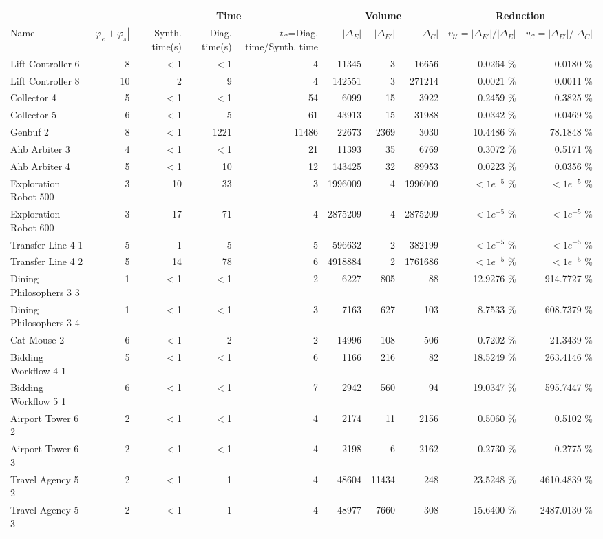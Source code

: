 \begin{tabular}{|l|r|rrr|rrr|rr|}
  \hline & & \multicolumn{3}{c|}{Time}&\multicolumn{3}{c|}{Volume} & \multicolumn{2}{c|}{Reduction}\\ \hline
Name & $|\varphi_e + \varphi_s|$ & Synth. time(s) & Diag. time(s) & $t_{\mathcal{C}}$=Diag. time/Synth. time & $|\Delta_E|$ & $|\Delta_{E'}|$ & $|\Delta_{C}|$ & $v_{\mathcal{U}}=|\Delta_{E'}|/|\Delta_{E}|$ & $v_{\mathcal{C}}=|\Delta_{E'}|/|\Delta_{C}|$ \\ 
  \hline
  Lift Controller 6 &   8 & $<$1 & $<$1 & 4 & 11345 & 3 & 16656 &  0.0264 \% &    0.0180 \% \\ 
Lift Controller 8 &  10 & 2 & 9 & 4 & 142551 & 3 & 271214 &  0.0021 \% &    0.0011 \% \\ 
  Collector 4 &   5 & $<$1 & $<$1 & 54 & 6099 & 15 & 3922 &  0.2459 \% &    0.3825 \% \\ 
Collector 5 &   6 & $<$1 & 5 & 61 & 43913 & 15 & 31988 &  0.0342 \% &    0.0469 \% \\ 
  Genbuf 2 &   8 & $<$1 & 1221 & 11486 & 22673 & 2369 & 3030 & 10.4486 \% &   78.1848 \% \\ 
Ahb Arbiter 3 &   4 & $<$1 & $<$1 & 21 & 11393 & 35 & 6769 &  0.3072 \% &    0.5171 \% \\ 
  Ahb Arbiter 4 &   5 & $<$1 & 10 & 12 & 143425 & 32 & 89953 &  0.0223 \% &    0.0356 \% \\ 
  Exploration Robot 500 &   3 & 10 & 33 & 3 & 1996009 & 4 & 1996009 & $<1e^{-5}$ \% & $<1e^{-5}$ \% \\ 
Exploration Robot 600 &   3 & 17 & 71 & 4 & 2875209 & 4 & 2875209 & $<1e^{-5}$ \% & $<1e^{-5}$ \% \\ 
  Transfer Line 4 1 &   5 & 1 & 5 & 5 & 596632 & 2 & 382199 & $<1e^{-5}$ \% & $<1e^{-5}$ \% \\ 
Transfer Line 4 2 &   5 & 14 & 78 & 6 & 4918884 & 2 & 1761686 & $<1e^{-5}$ \% & $<1e^{-5}$ \% \\ 
  Dining Philosophers 3 3 &   1 & $<$1 & $<$1 & 2 & 6227 & 805 &  88 & 12.9276 \% &  914.7727 \% \\ 
Dining Philosophers 3 4 &   1 & $<$1 & $<$1 & 3 & 7163 & 627 & 103 &  8.7533 \% &  608.7379 \% \\ 
  Cat Mouse 2 &   6 & $<$1 & 2 & 2 & 14996 & 108 & 506 &  0.7202 \% &   21.3439 \% \\ 
  Bidding Workflow 4 1 &   5 & $<$1 & $<$1 & 6 & 1166 & 216 &  82 & 18.5249 \% &  263.4146 \% \\ 
Bidding Workflow 5 1 &   6 & $<$1 & $<$1 & 7 & 2942 & 560 &  94 & 19.0347 \% &  595.7447 \% \\ 
  Airport Tower 6 2 &   2 & $<$1 & $<$1 & 4 & 2174 & 11 & 2156 &  0.5060 \% &    0.5102 \% \\ 
  Airport Tower 6 3 &   2 & $<$1 & $<$1 & 4 & 2198 & 6 & 2162 &  0.2730 \% &    0.2775 \% \\ 
  Travel Agency 5 2 &   2 & $<$1 & 1 & 4 & 48604 & 11434 & 248 & 23.5248 \% & 4610.4839 \% \\ 
  Travel Agency 5 3 &   2 & $<$1 & 1 & 4 & 48977 & 7660 & 308 & 15.6400 \% & 2487.0130 \% \\ 
   \hline
\end{tabular}
